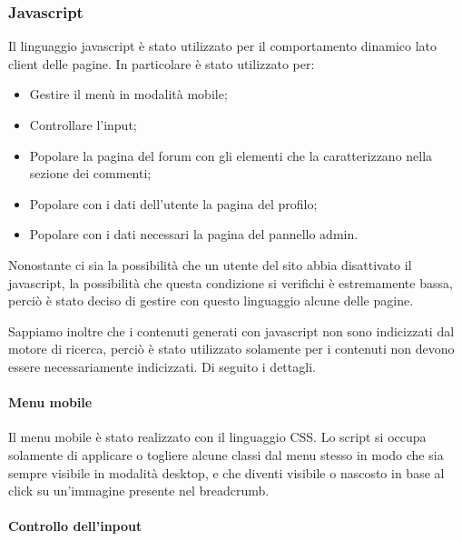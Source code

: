 \subsubsection{Javascript}\label{subs:js}

Il linguaggio javascript è stato utilizzato per il comportamento dinamico lato client delle pagine. In particolare è stato utilizzato per: 

\begin{itemize}
    
	\item Gestire il menù in modalità mobile;
    \item Controllare l'input;
	\item Popolare la pagina del forum con gli elementi che la caratterizzano nella sezione dei commenti;
	\item Popolare con i dati dell'utente la pagina del profilo;
	\item Popolare con i dati necessari la pagina del pannello admin.
	
\end{itemize}

Nonostante ci sia la possibilità che un utente del sito abbia disattivato il javascript, la possibilità che questa condizione si verifichi è estremamente bassa, perciò è stato deciso di gestire con questo linguaggio alcune delle pagine. 

Sappiamo inoltre che i contenuti generati con javascript non sono indicizzati dal motore di ricerca, perciò è stato utilizzato solamente per i contenuti non devono essere necessariamente indicizzati. Di seguito i dettagli.

\paragraph{Menu mobile} %

Il menu mobile è stato realizzato con il linguaggio CSS. Lo script si occupa solamente di applicare o togliere alcune classi dal menu stesso in modo che sia sempre visibile in modalità desktop, e che diventi visibile o nascosto in base al click su un'immagine 
presente nel breadcrumb.

\paragraph{Controllo dell'inpout}

